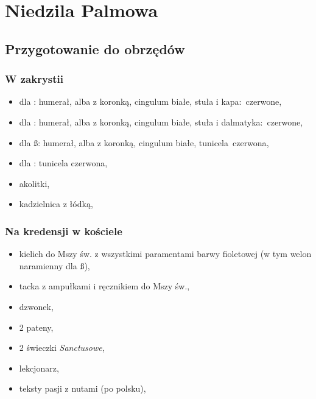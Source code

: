 \chapter{Niedzila Palmowa}

\section{Przygotowanie do obrzędów}
		
		\subsection{W zakrystii}
		
			\begin{itemize}
   				\item dla \ii: humerał, alba z koronką, cingulum białe, stuła i kapa: {\color{red}czerwone},
				\item dla \dd: humerał, alba z koronką, cingulum białe, stuła i dalmatyka: {\color{red}czerwone},
				\item dla \ss: humerał, alba z koronką, cingulum białe, tunicela {\color{red}czerwona},
				\item dla : tunicela {\color{red}czerwona},
				\item akolitki,
				\item kadzielnica z łódką, 
			\end{itemize}
		
		\subsection{Na kredensji w kościele}
		
			\begin{itemize}
				\item kielich do Mszy św. z wszystkimi paramentami barwy  {\color{violet}fioletowej} (w tym welon naramienny dla \ss),
				\item tacka z ampułkami i ręcznikiem do Mszy św.,
				\item dzwonek,
				\item 2 pateny,
				\item 2 świeczki \textit{Sanctusowe},
				\item lekcjonarz,
				\item teksty pasji z nutami (po polsku),
			\end{itemize}
		
			
